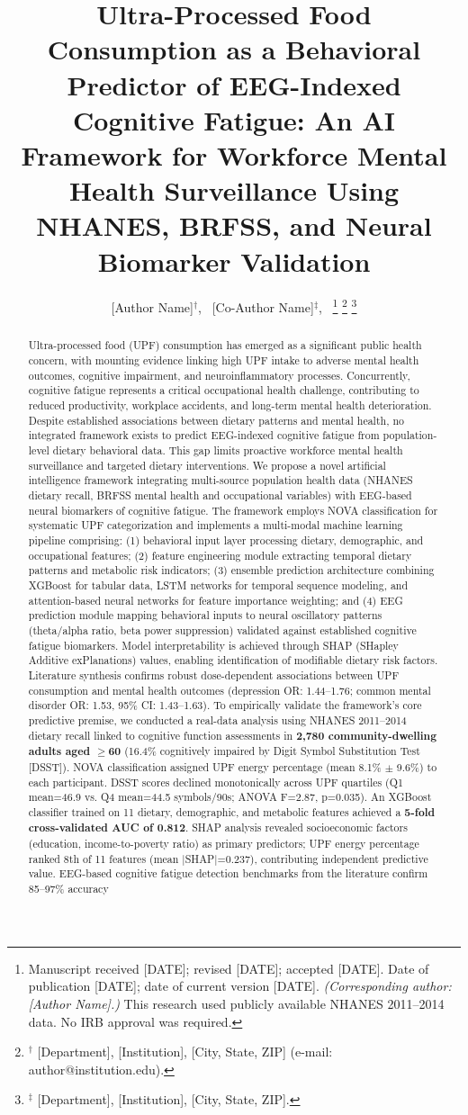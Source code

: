 \documentclass[journal,twoside,10pt]{IEEEtran}
\title{Ultra-Processed Food Consumption as a Behavioral Predictor of EEG-Indexed Cognitive Fatigue: An AI Framework for Workforce Mental Health Surveillance Using NHANES, BRFSS, and Neural Biomarker Validation}
\author{[Author Name]$^{\dagger}$,~\IEEEmembership{Member,~IEEE,}
        [Co-Author Name]$^{\ddagger}$,~\IEEEmembership{Senior Member,~IEEE}%
\thanks{Manuscript received [DATE]; revised [DATE]; accepted [DATE]. Date of publication [DATE]; date of current version [DATE]. \textit{(Corresponding author: [Author Name].)}
This research used publicly available NHANES 2011--2014 data. No IRB approval was required.}
\thanks{$^{\dagger}$ [Department], [Institution], [City, State, ZIP] (e-mail: author@institution.edu).}
\thanks{$^{\ddagger}$ [Department], [Institution], [City, State, ZIP].}
}
\begin{document}
\maketitle

\begin{abstract}
Ultra-processed food (UPF) consumption has emerged as a significant public health concern, with mounting evidence linking high UPF intake to adverse mental health outcomes, cognitive impairment, and neuroinflammatory processes. Concurrently, cognitive fatigue represents a critical occupational health challenge, contributing to reduced productivity, workplace accidents, and long-term mental health deterioration. Despite established associations between dietary patterns and mental health, no integrated framework exists to predict EEG-indexed cognitive fatigue from population-level dietary behavioral data. This gap limits proactive workforce mental health surveillance and targeted dietary interventions. We propose a novel artificial intelligence framework integrating multi-source population health data (NHANES dietary recall, BRFSS mental health and occupational variables) with EEG-based neural biomarkers of cognitive fatigue. The framework employs NOVA classification for systematic UPF categorization and implements a multi-modal machine learning pipeline comprising: (1) behavioral input layer processing dietary, demographic, and occupational features; (2) feature engineering module extracting temporal dietary patterns and metabolic risk indicators; (3) ensemble prediction architecture combining XGBoost for tabular data, LSTM networks for temporal sequence modeling, and attention-based neural networks for feature importance weighting; and (4) EEG prediction module mapping behavioral inputs to neural oscillatory patterns (theta/alpha ratio, beta power suppression) validated against established cognitive fatigue biomarkers. Model interpretability is achieved through SHAP (SHapley Additive exPlanations) values, enabling identification of modifiable dietary risk factors. Literature synthesis confirms robust dose-dependent associations between UPF consumption and mental health outcomes (depression OR: 1.44--1.76; common mental disorder OR: 1.53, 95\% CI: 1.43--1.63). To empirically validate the framework's core predictive premise, we conducted a real-data analysis using NHANES 2011--2014 dietary recall linked to cognitive function assessments in \textbf{2,780 community-dwelling adults aged $\geq$60} (16.4\% cognitively impaired by Digit Symbol Substitution Test [DSST]). NOVA classification assigned UPF energy percentage (mean 8.1\% $\pm$ 9.6\%) to each participant. DSST scores declined monotonically across UPF quartiles (Q1 mean=46.9 vs. Q4 mean=44.5 symbols/90s; ANOVA F=2.87, p=0.035). An XGBoost classifier trained on 11 dietary, demographic, and metabolic features achieved a \textbf{5-fold cross-validated AUC of 0.812}. SHAP analysis revealed socioeconomic factors (education, income-to-poverty ratio) as primary predictors; UPF energy percentage ranked 8th of 11 features (mean |SHAP|=0.237), contributing independent predictive value. EEG-based cognitive fatigue detection benchmarks from the literature confirm 85--97\% accuracy 
\end{abstract}
\end{document}
